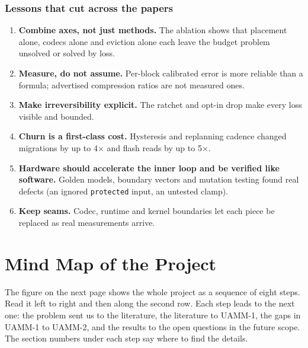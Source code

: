 \documentclass[12pt,a4paper]{report}
\begin{document}
\subsection{Lessons that cut across the papers}
\begin{enumerate}
\item \textbf{Combine axes, not just methods.} The ablation shows that placement alone, codecs alone and eviction alone each leave the budget problem unsolved or solved by loss.
\item \textbf{Measure, do not assume.} Per-block calibrated error is more reliable than a formula; advertised compression ratios are not measured ones.
\item \textbf{Make irreversibility explicit.} The ratchet and opt-in drop make every loss visible and bounded.
\item \textbf{Churn is a first-class cost.} Hysteresis and replanning cadence changed migrations by up to 4× and flash reads by up to 5×.
\item \textbf{Hardware should accelerate the inner loop and be verified like software.} Golden models, boundary vectors and mutation testing found real defects (an ignored \texttt{protected} input, an untested clamp).
\item \textbf{Keep seams.} Codec, runtime and kernel boundaries let each piece be replaced as real measurements arrive.
\end{enumerate}
\chapter{Mind Map of the Project}
The figure on the next page shows the whole project as a sequence of eight steps. Read it left to right and then along the second row. Each step leads to the next one: the problem sent us to the literature, the literature to UAMM-1, the gaps in UAMM-1 to UAMM-2, and the results to the open questions in the future scope. The section numbers under each step say where to find the details.
\end{document}
